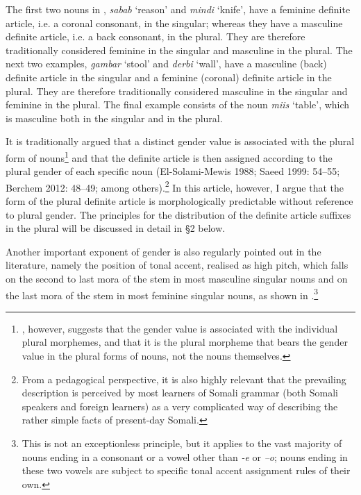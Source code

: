 \documentclass[output=paper]{langsci/langscibook}
\begin{document}
The first two nouns in , \textit{sabab }‘reason’ and \textit{mindi} ‘knife’, have a feminine definite article, i.e. a coronal consonant, in the singular; whereas they have a masculine definite article, i.e. a back consonant, in the plural. They are therefore traditionally considered feminine in the singular and masculine in the plural. The next two examples, \textit{gambar} ‘stool’ and \textit{derbi} ‘wall’, have a masculine (back) definite article in the singular and a feminine (coronal) definite article in the plural. They are therefore traditionally considered masculine in the singular and feminine in the plural. The final example consists of the noun \textit{miis} ‘table’, which is masculine both in the singular and in the plural.

It is traditionally argued that a distinct gender value is associated with the plural form of nouns\footnote{\citet{Lecarme2002}, however, suggests that the gender value is associated with the individual plural morphemes, and that it is the plural morpheme that bears the gender value in the plural forms of nouns, not the nouns themselves.} and that the definite article is then assigned according to the plural gender of each specific noun (El-Solami-Mewis 1988; Saeed 1999: 54{}--55; Berchem 2012: 48{}--49; among others).\footnote{From a pedagogical perspective, it is also highly relevant that the prevailing description is perceived by most learners of Somali grammar (both Somali speakers and foreign learners) as a very complicated way of describing the rather simple facts of present-day Somali.}  In this article, however, I argue that the form of the plural definite article is morphologically predictable without reference to plural gender. The principles for the distribution of the definite article suffixes in the plural will be discussed in detail in §2 below.

Another important exponent of gender is also regularly pointed out in the literature, namely the position of tonal accent, realised as high pitch, which falls on the second to last mora of the stem in most masculine singular nouns and on the last mora of the stem in most feminine singular nouns, as shown in .\footnote{This is not an exceptionless principle, but it applies to the vast majority of nouns ending in a consonant or a vowel other than \textit{{}-e} or \textit{–o}; nouns ending in these two vowels are subject to specific tonal accent assignment rules of their own.}
 
\end{document}
